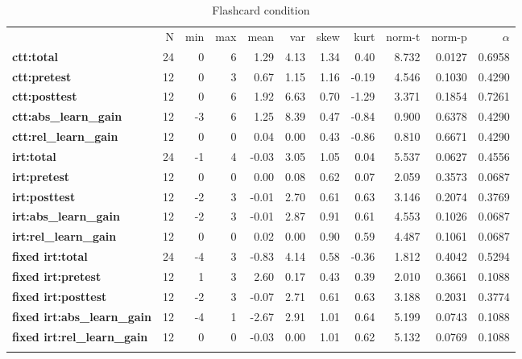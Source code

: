 \begin{longtable}[c]{@{}lrrrrrrrrrr@{}}
\caption{Flashcard condition}\\
\endfirsthead
\endhead
\toprule\addlinespace
& N & min & max & mean & var & skew & kurt & norm-t &
norm-p & $\alpha$
\\
\addlinespace
\midrule
\textbf{ctt:total} & 24 & 0 & 6 & 1.29 & 4.13 & 1.34 & 0.40 & 8.732 &
0.0127 & 0.6958
\\\addlinespace
\textbf{ctt:pretest} & 12 & 0 & 3 & 0.67 & 1.15 & 1.16 & -0.19 & 4.546 &
0.1030 & 0.4290
\\\addlinespace
\textbf{ctt:posttest} & 12 & 0 & 6 & 1.92 & 6.63 & 0.70 & -1.29 & 3.371
& 0.1854 & 0.7261
\\\addlinespace
\textbf{ctt:abs\_learn\_gain} & 12 & -3 & 6 & 1.25 & 8.39 & 0.47 & -0.84
& 0.900 & 0.6378 & 0.4290
\\\addlinespace
\textbf{ctt:rel\_learn\_gain} & 12 & 0 & 0 & 0.04 & 0.00 & 0.43 & -0.86
& 0.810 & 0.6671 & 0.4290
\\\addlinespace
\textbf{irt:total} & 24 & -1 & 4 & -0.03 & 3.05 & 1.05 & 0.04 & 5.537 &
0.0627 & 0.4556
\\\addlinespace
\textbf{irt:pretest} & 12 & 0 & 0 & 0.00 & 0.08 & 0.62 & 0.07 & 2.059 &
0.3573 & 0.0687
\\\addlinespace
\textbf{irt:posttest} & 12 & -2 & 3 & -0.01 & 2.70 & 0.61 & 0.63 & 3.146
& 0.2074 & 0.3769
\\\addlinespace
\textbf{irt:abs\_learn\_gain} & 12 & -2 & 3 & -0.01 & 2.87 & 0.91 & 0.61
& 4.553 & 0.1026 & 0.0687
\\\addlinespace
\textbf{irt:rel\_learn\_gain} & 12 & 0 & 0 & 0.02 & 0.00 & 0.90 & 0.59 &
4.487 & 0.1061 & 0.0687
\\\addlinespace
\textbf{fixed irt:total} & 24 & -4 & 3 & -0.83 & 4.14 & 0.58 & -0.36
& 1.812 & 0.4042 & 0.5294
\\\addlinespace
\textbf{fixed irt:pretest} & 12 & 1 & 3 & 2.60 & 0.17 & 0.43 & 0.39 &
2.010 & 0.3661 & 0.1088
\\\addlinespace
\textbf{fixed irt:posttest} & 12 & -2 & 3 & -0.07 & 2.71 & 0.61 &
0.63 & 3.188 & 0.2031 & 0.3774
\\\addlinespace
\textbf{fixed irt:abs\_learn\_gain} & 12 & -4 & 1 & -2.67 & 2.91 &
1.01 & 0.64 & 5.199 & 0.0743 & 0.1088
\\\addlinespace
\textbf{fixed irt:rel\_learn\_gain} & 12 & 0 & 0 & -0.03 & 0.00 &
1.01 & 0.62 & 5.132 & 0.0769 & 0.1088
\\\addlinespace
\bottomrule
    \label{tab:know_fc}
\end{longtable}

